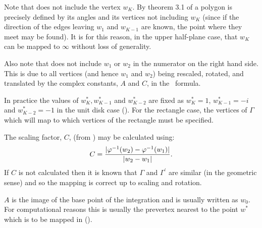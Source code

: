 Note that  does not include the vertex $w_K$. By theorem 3.1 of \cite[p. 24]{driscoll} a polygon is precisely defined by its angles and its vertices not including $w_K$ (since if the direction of the edges leaving $w_1$ and $w_{K-1}$ are known, the point where they meet may be found). It is for this reason, in the upper half-plane case, that $w_K$ can be mapped to $\infty$ without loss of generality.

Also note that  does not include $w_1$ or $w_2$ in the numerator on the right hand side. This is due to all vertices (and hence $w_1$ and $w_2$) being rescaled, rotated, and translated by the complex constants, $A$ and $C$, in the \sch\ formula.

In practice the values of $w^*_K, w^*_{K-1}$ and $w^*_{K-2}$ are fixed as $w^*_K=1$, $w^*_{K-1}=-i$ and $w^*_{K-2}=-1$ in the unit disk case (\cite[p. 24]{driscoll}). For the rectangle case, the vertices of $\Gamma$ which will map to which vertices of the rectangle must be specified.

The scaling factor, $C$, (from ) may be calculated using:
\begin{equation}
C=\frac{\vert \varphi^{-1}(w_2)-\varphi^{-1}(w_1)\vert}{\vert w_2 - w_1\vert}.
\end{equation}
If $C$ is not calculated then it is known that $\Gamma$ and $\Gamma^\prime$ are similar (in the geometric sense) and so the mapping is correct up to scaling and rotation. 

$A$ is the image of the base point of the integration and is usually written as $w_0$. For computational reasons this is usually the prevertex nearest to the point $w^*$ which is to be mapped in   (\cite[p. 27]{driscoll}).


